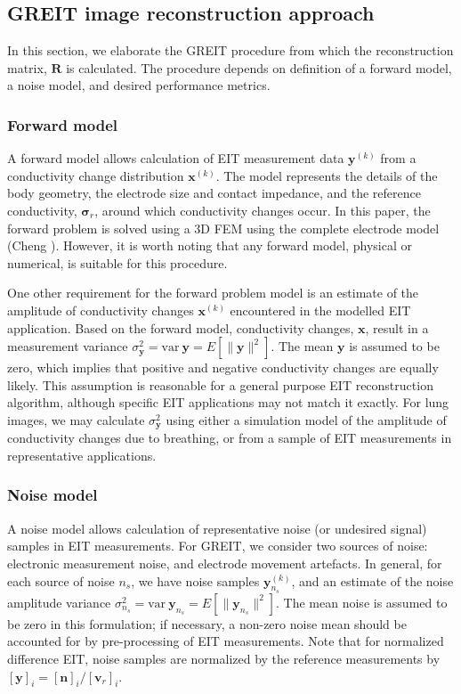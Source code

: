 \documentclass[12pt]{iopart}
\newcommand{\vB}{\mbox{$\mathbf{v}$}}
\newcommand{\xB}{\mbox{$\mathbf{x}$}}
\newcommand{\nB}{\mbox{$\mathbf{n}$}}
\newcommand{\yB}{\mbox{$\mathbf{y}$}}
\newcommand{\RB}{\mbox{$\mathbf{R}$}}
\newcommand{\sG}{\mbox{${\boldsymbol \sigma}$}}
\begin{document}
\subsection{GREIT image reconstruction approach}

In this section, we elaborate the GREIT procedure
from which the reconstruction matrix, $\RB$ is
calculated.  The procedure depends on definition
of a forward model, a noise model, and
desired performance metrics.

\subsubsection{Forward model}

A forward model allows calculation of EIT
 measurement
data $\yB^{(k)}$ from a conductivity change distribution $\xB^{(k)}$.
The model represents the details of the body geometry,
the electrode size and contact impedance, and the reference
conductivity, $\sG_r$, around which conductivity changes occur.
In this paper, the forward problem is solved using a
3D FEM using the complete electrode model
(Cheng ). However, it is worth noting that 
any forward model, physical or numerical, is suitable
for this procedure.

One other requirement for the forward problem model is
an estimate of the amplitude of conductivity changes $\xB^{(k)}$
encountered in the modelled EIT application. Based on the
forward model, conductivity changes, $\xB$, result in
a measurement variance
$\sigma_{\yB}^2 = \mathrm{var}~\yB = E[ \| \yB \|^2 ]$. 
The mean $\yB$ is assumed to be zero, which implies
that positive and negative conductivity changes are
equally likely. This assumption is reasonable for a 
general purpose EIT reconstruction algorithm, although
specific EIT applications may not match it exactly.
For lung images, we may calculate $\sigma_{\yB}^2$ using
either a simulation model
of the amplitude of conductivity changes due
to breathing, or from a sample of EIT measurements 
in representative applications.

\subsubsection{Noise model}

A noise model allows calculation of representative 
noise (or undesired signal) samples in EIT measurements.
For GREIT, we consider two sources of noise:
electronic measurement noise, and
electrode movement artefacts. In general, for each
source of noise $n_s$, we have noise samples $\yB^{(k)}_{n_s}$,
and an estimate of the noise amplitude variance
 $\sigma_{n_s}^2 = \mathrm{var}~\yB_{n_s} = E[ \| \yB_{n_s} \|^2 ]$. 
The mean noise is assumed to be zero in this formulation;
if necessary, a non-zero noise mean should be accounted for
by pre-processing of EIT measurements.
Note that for normalized difference EIT,
noise samples are normalized by the
reference measurements by $[\yB]_i = [\nB ]_i / [\vB_r]_i$.
\end{document}
